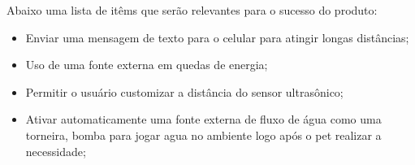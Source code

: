 \documentclass[12pt,a4paper]{article}
\begin{document}
Abaixo uma lista de itêms que serão relevantes para o sucesso do produto:

\begin{itemize}
	\item Enviar uma mensagem de texto para o celular para atingir longas
		distâncias;
	\item Uso de uma fonte externa em quedas de energia;
	\item Permitir o usuário customizar a distância do sensor ultrasônico;
	\item Ativar automaticamente uma fonte externa de fluxo de água como uma
		torneira, bomba para jogar agua no ambiente logo após o pet realizar a
		necessidade;
\end{itemize}
\end{document}
